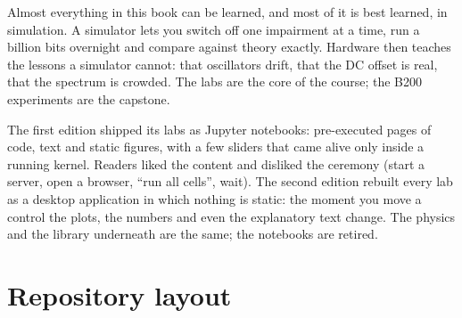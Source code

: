 \begin{keyidea}
Almost everything in this book can be learned, and most of it is best learned, in simulation. A
simulator lets you switch off one impairment at a time, run a billion bits overnight and compare
against theory exactly. Hardware then teaches the lessons a simulator cannot: that oscillators
drift, that the DC offset is real, that the spectrum is crowded. The labs are the core of the
course; the B200 experiments are the capstone.
\end{keyidea}

\begin{history}
The first edition shipped its labs as Jupyter notebooks: pre-executed pages of code, text and
static figures, with a few sliders that came alive only inside a running kernel. Readers liked the
content and disliked the ceremony (start a server, open a browser, ``run all cells'', wait). The
second edition rebuilt every lab as a desktop application in which nothing is static: the moment
you move a control the plots, the numbers and even the explanatory text change. The physics and the
library underneath are the same; the notebooks are retired.
\end{history}

\section{Repository layout}
\label{sec:appB:layout}

